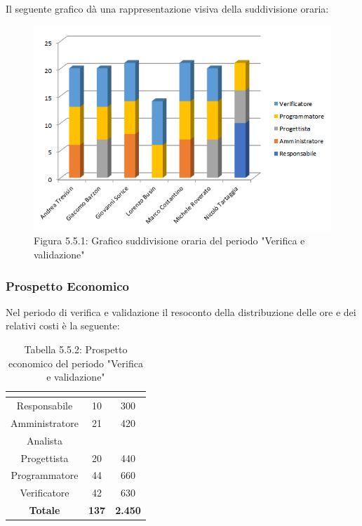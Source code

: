 Il seguente grafico dà una rappresentazione visiva della suddivisione oraria: \\
\begin{figure} [H]
	\centering
	\includegraphics[scale=1]{Res/ExcelGrafici/Grafici/VerificaOre.png}
	\caption{Figura 5.5.1: Grafico suddivisione oraria del periodo "Verifica e validazione"}\label{}
\end{figure}


\subsubsection{Prospetto Economico}
Nel periodo di verifica e validazione il resoconto della distribuzione delle ore e dei relativi costi è la seguente:

\renewcommand{\arraystretch}{1.5}
\begin{table}[H]
\begin{center}
\begin{tabular}{|c|c|c|}
\hline
\rowcolor{title_row}
\textbf{\color{title_text}{Ruolo}}  & \textbf{\color{title_text}{Ore}} & \textbf{\color{title_text}{Costo in \euro}} \\ \hline
Responsabile    & 10 & 300 \\ \hline
Amministratore  & 21 & 420 \\ \hline
Analista        & & \\ \hline
Progettista     & 20 & 440 \\ \hline
Programmatore   & 44 & 660 \\ \hline
Verificatore    & 42 & 630 \\ \hline
\textbf{Totale} & \textbf{137}    & \textbf{2.450}           \\ \hline
\end{tabular}
\caption{Tabella 5.5.2: Prospetto economico del periodo "Verifica e validazione"\label{}}
\end{center}
\end{table}
\renewcommand{\arraystretch}{1}


